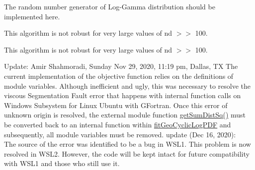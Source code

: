 
\begin{DoxyRefList}
\item[Subprogram \mbox{\hyperlink{namespaceDistUniLogGamma__mod_acc6e60c6fa66c784f1f801eb419ecbff}{Dist\+Uni\+Log\+Gamma\+\_\+mod\+::rand}} (self)]\label{todo__todo000001}%
%
 The random number generator of Log-\/\+Gamma distribution should be implemented here.  
\item[Subprogram \mbox{\hyperlink{namespaceDomainEllipsoid__mod_af8b7bb6f4a7187929560cf43e212c465}{Domain\+Ellipsoid\+\_\+mod\+::get\+Rand\+Unit\+Radius\+MVU}} (nd)]\label{todo__todo000003}%
%
 This algorithm is not robust for very large values of {\ttfamily nd \texorpdfstring{$>$}{>}\texorpdfstring{$>$}{>} 100}. 
\item[Subprogram \mbox{\hyperlink{namespaceDomainEllipsoid__mod_a3e1e740aa58603709ce157c49d86efdc}{Domain\+Ellipsoid\+\_\+mod\+::get\+Rand\+Unit\+Volume\+MVU}} (nd, log\+Vol\+Unit\+Ball)]\label{todo__todo000002}%
%
 This algorithm is not robust for very large values of {\ttfamily nd \texorpdfstring{$>$}{>}\texorpdfstring{$>$}{>} 100}. 
\item[Subprogram \mbox{\hyperlink{namespaceFitGeoCyclic__mod_a1a460b8ee015e2e9353625bb0cc3569d}{Fit\+Geo\+Cyclic\+\_\+mod\+::fit\+Geo\+Cyclic\+Log\+PDF}} (max\+Num\+Trial, num\+Trial, Success\+Step, Log\+Count)]\label{todo__todo000004}%
%
 Update\+: Amir Shahmoradi, Sunday Nov 29, 2020, 11\+:19 pm, Dallas, TX The current implementation of the objective function relies on the definitions of module variables. Although inefficient and ugly, this was necessary to resolve the viscous Segmentation Fault error that happens with internal function calls on Windows Subsystem for Linux Ubuntu with GFortran. Once this error of unknown origin is resolved, the external module function {\ttfamily \mbox{\hyperlink{FitGeoCyclic__mod_8f90_a4c961cfd8f5acd4f093f7124880203cd}{get\+Sum\+Dist\+Sq()}}} must be converted back to an internal function within \mbox{\hyperlink{namespaceFitGeoCyclic__mod_a1a460b8ee015e2e9353625bb0cc3569d}{fit\+Geo\+Cyclic\+Log\+PDF}} and subsequently, all module variables must be removed. update (Dec 16, 2020)\+: ~\newline
 The source of the error was identified to be a bug in WSL1. This problem is now resolved in WSL2. However, the code will be kept intact for future compatibility with WSL1 and those who still use it. 
\item[Subprogram \mbox{\hyperlink{namespaceHistogram__mod_ad80a9c34cbdd54d1c6b5d652c4def668}{Histogram\+\_\+mod\+::get\+Bin}} (x, lower\+Bound, nbin, binsize)]\label{todo__todo000005}%

\end{DoxyRefList}
